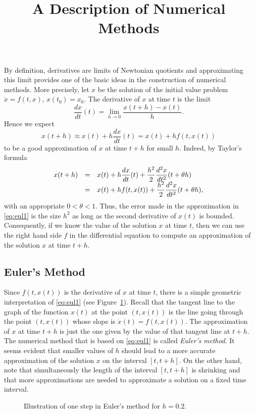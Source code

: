 \documentclass{ximera}
\title{A Description of Numerical Methods}
\begin{document}
\begin{abstract}
\end{abstract}
\maketitle


\label{sec:DNM}

By definition, derivatives are limits of Newtonian quotients and 
approximating this limit provides one of the basic ideas in the 
construction of numerical methods.  More precisely, let $x$ be the 
solution of the initial value problem $\dot x = f(t,x)$, $x(t_0)=x_0$.  
The derivative of $x$ at time $t$ is the limit
\[
\frac{dx}{dt}(t) = \lim_{h\to 0} \frac{x(t+h) - x(t)}{h}.
\]
Hence we expect
\begin{equation}  \label{eq:eul1}
x(t+h) \approx x(t) + h \frac{dx}{dt}(t) = x(t) + h f(t,x(t))
\end{equation}
to be a good approximation of $x$ at time $t+h$ for small $h$.
Indeed, by Taylor's formula
\arraystart
\begin{equation}\label{eq:tfeul}
\begin{array}{rcl}
\displaystyle x(t+h)&=&
\displaystyle x(t)+h\frac{dx}{dt}(t)+\frac{h^2}{2}\frac{d^2x}{dt^2}(t+\theta h)\\
&=& \displaystyle x(t)+hf(t,x(t))+\frac{h^2}{2}\frac{d^2x}{dt^2}(t+\theta h),
\end{array}
\end{equation}
\arrayfinish
with an appropriate $0<\theta<1$.  Thus, the error made in the
approximation in \eqref{eq:eul1} is the size $h^2$
as long as the second derivative of $x(t)$ is bounded.
Consequently, if we know the value of the solution $x$ at time $t$, 
then we can use the right hand side $f$ in the differential equation 
to compute an approximation of the solution $x$ at time $t+h$.

\subsection*{Euler's Method} 

Since $f(t,x(t))$ is the derivative of $x$ at time $t$,
there is a simple geometric interpretation of \eqref{eq:eul1}
(see Figure~\ref{fig:eul1ill}).  Recall that the tangent line to the 
graph of the function $x(t)$ at the point $(t,x(t))$ is the line 
going through the point $(t,x(t))$ whose slope is $\dot{x}(t)=f(t,x(t))$.  
The approximation of $x$ at time $t+h$ is just the one given by the value 
of that tangent line at $t+h$.  The numerical method that is based on 
\eqref{eq:eul1} is called {\em Euler's method}.
It seems evident that smaller values of $h$ should lead to a more 
accurate approximation of the solution $x$ on the interval
$[t,t+h]$.  On the other hand, note that simultaneously the 
length of the interval $[t,t+h]$ is shrinking and that more
approximations are needed to approximate a solution on a
fixed time interval.
\begin{figure}[htb]
   \centerline{%
   }
   \caption{Illustration of one step in Euler's method
   for $h=0.2$.}
   \label{fig:eul1ill}
\end{figure}
\end{document}
